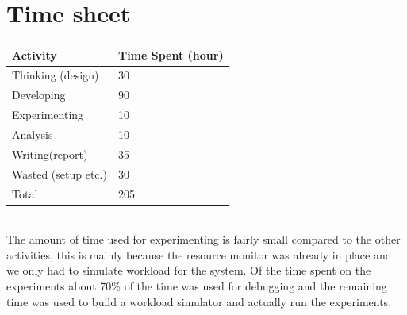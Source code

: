 \documentclass[10pt,journal,compsoc]{IEEEtran}
\begin{document}
\section{Time sheet}
\label{sec:Time sheet}
    \begin{tabular}{|l|l|}
        \hline
        \textbf{Activity} & \textbf{Time Spent (hour)}\\
        \hline
        Thinking (design)& 30\\
        Developing &  90 \\
        Experimenting & 10 \\
        Analysis & 10 \\
        Writing(report) & 35 \\
        Wasted (setup etc.) & 30\\
        \hline
        \hline
        Total & 205\\
        \hline
    \end{tabular}\\

  The amount of time used for experimenting is fairly small compared to the
  other activities, this is mainly because the
  resource monitor was already in place and we only had to simulate workload for
  the system. Of the time spent on the experiments about 70\% of the time was
  used for debugging and the remaining time was used to build a workload
  simulator and actually run the experiments.
\end{document}
